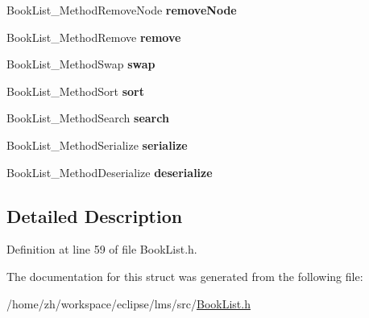 \begin{DoxyCompactItemize}
\item 
\hypertarget{structBookList__Methods_a067f25a654a8201e30bcd335dd4e6cb4}{Book\-List\-\_\-\-Method\-Remove\-Node {\bfseries remove\-Node}}\label{structBookList__Methods_a067f25a654a8201e30bcd335dd4e6cb4}

\item 
\hypertarget{structBookList__Methods_aef497cbf5b4084d3cce37915d6485520}{Book\-List\-\_\-\-Method\-Remove {\bfseries remove}}\label{structBookList__Methods_aef497cbf5b4084d3cce37915d6485520}

\item 
\hypertarget{structBookList__Methods_a7c77a8f9eaa2b66313a05a9bec8c6d1d}{Book\-List\-\_\-\-Method\-Swap {\bfseries swap}}\label{structBookList__Methods_a7c77a8f9eaa2b66313a05a9bec8c6d1d}

\item 
\hypertarget{structBookList__Methods_a777cba67578a5d9897af506c92b5eef8}{Book\-List\-\_\-\-Method\-Sort {\bfseries sort}}\label{structBookList__Methods_a777cba67578a5d9897af506c92b5eef8}

\item 
\hypertarget{structBookList__Methods_a40bf6787f3f73e991b3821c450b18140}{Book\-List\-\_\-\-Method\-Search {\bfseries search}}\label{structBookList__Methods_a40bf6787f3f73e991b3821c450b18140}

\item 
\hypertarget{structBookList__Methods_a014aa2655d68a482a9f91e71367a42ca}{Book\-List\-\_\-\-Method\-Serialize {\bfseries serialize}}\label{structBookList__Methods_a014aa2655d68a482a9f91e71367a42ca}

\item 
\hypertarget{structBookList__Methods_a2e532939e9a14b50d4c85889fc36fbae}{Book\-List\-\_\-\-Method\-Deserialize {\bfseries deserialize}}\label{structBookList__Methods_a2e532939e9a14b50d4c85889fc36fbae}

\end{DoxyCompactItemize}


\subsection{Detailed Description}


Definition at line 59 of file Book\-List.\-h.



The documentation for this struct was generated from the following file\-:\begin{DoxyCompactItemize}
\item 
/home/zh/workspace/eclipse/lms/src/\hyperlink{BookList_8h}{Book\-List.\-h}\end{DoxyCompactItemize}
